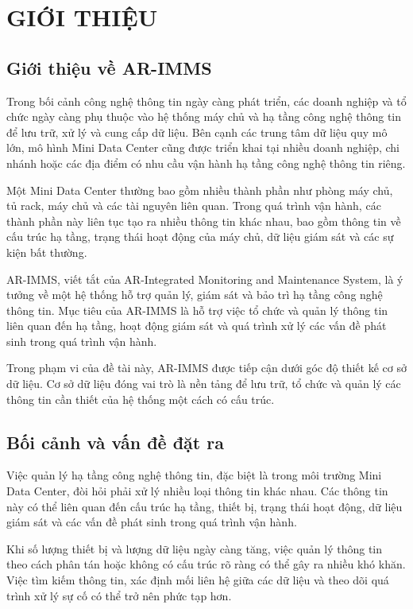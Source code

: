 \chapter{GIỚI THIỆU}

\section{Giới thiệu về AR-IMMS}
Trong bối cảnh công nghệ thông tin ngày càng phát triển, các doanh nghiệp và tổ chức ngày càng phụ thuộc vào hệ thống máy chủ và hạ tầng công nghệ thông tin để lưu trữ, xử lý và cung cấp dữ liệu. Bên cạnh các trung tâm dữ liệu quy mô lớn, mô hình Mini Data Center cũng được triển khai tại nhiều doanh nghiệp, chi nhánh hoặc các địa điểm có nhu cầu vận hành hạ tầng công nghệ thông tin riêng.

Một Mini Data Center thường bao gồm nhiều thành phần như phòng máy chủ, tủ rack, máy chủ và các tài nguyên liên quan. Trong quá trình vận hành, các thành phần này liên tục tạo ra nhiều thông tin khác nhau, bao gồm thông tin về cấu trúc hạ tầng, trạng thái hoạt động của máy chủ, dữ liệu giám sát và các sự kiện bất thường.

AR-IMMS, viết tắt của AR-Integrated Monitoring and Maintenance System, là ý tưởng về một hệ thống hỗ trợ quản lý, giám sát và bảo trì hạ tầng công nghệ thông tin. Mục tiêu của AR-IMMS là hỗ trợ việc tổ chức và quản lý thông tin liên quan đến hạ tầng, hoạt động giám sát và quá trình xử lý các vấn đề phát sinh trong quá trình vận hành.

Trong phạm vi của đề tài này, AR-IMMS được tiếp cận dưới góc độ thiết kế cơ sở dữ liệu. Cơ sở dữ liệu đóng vai trò là nền tảng để lưu trữ, tổ chức và quản lý các thông tin cần thiết của hệ thống một cách có cấu trúc.

\section{Bối cảnh và vấn đề đặt ra}
Việc quản lý hạ tầng công nghệ thông tin, đặc biệt là trong môi trường Mini Data Center, đòi hỏi phải xử lý nhiều loại thông tin khác nhau. Các thông tin này có thể liên quan đến cấu trúc hạ tầng, thiết bị, trạng thái hoạt động, dữ liệu giám sát và các vấn đề phát sinh trong quá trình vận hành.

Khi số lượng thiết bị và lượng dữ liệu ngày càng tăng, việc quản lý thông tin theo cách phân tán hoặc không có cấu trúc rõ ràng có thể gây ra nhiều khó khăn. Việc tìm kiếm thông tin, xác định mối liên hệ giữa các dữ liệu và theo dõi quá trình xử lý sự cố có thể trở nên phức tạp hơn.

